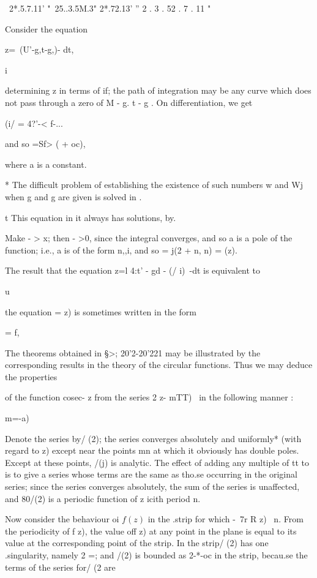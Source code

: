 { ~2*.5.7.11' "~25..3.5M.3" 2*.72.13' '' 2 . 3 . 52 . 7 . 11 "

 Consider the equation

z=\ (U'-g,t-g,)- dt,

  i

determining z in terms of if; the path of integration may be any
curve which does not pass through a zero of M - g. t - g . On
differentiation, we get

(i/ = 4?'-< f-...

and so =Sf> ( + oc),

where a is a constant.

* The difficult problem of establishing the existence of such numbers
w and Wj when g and g are given is solved in .

t This equation in it always has solutions, by.

%
%

Make - > x; then - >0, since the integral converges, and so a is a
pole of the function; i.e., a is of the form n,,i, and so = j(2 + n,
n) = (z).

The result that the equation z=l 4:t' - gd - (/ i)~-dt is equivalent
to

u

the equation = z) is sometimes written in the form

= f,


The theorems obtained in §>; 20'2-20'221 may be illustrated by the
corresponding results in the theory of the circular functions. Thus we
may deduce the properties

of the function cosec- z from the series 2 z- mTT)~ in the following
manner :

m=-a)

Denote the series by/ (2); the series converges absolutely and
uniformly* (with regard to z) except near the points mn at which it
obviously has double poles. Except at these points, /(j) is analytic.
The effect of adding any multiple of tt to is to give a series whose
terms are the same as tho.se occurring in the original series; since
the series converges absolutely, the sum of the series is unaffected,
and 80/(2) is a periodic function of z icith period n.

Now consider the behaviour oi $f(z)$ in the .strip for which -\ 7r R z)
\ n. From the periodicity of f z), the value off z) at any point in
the plane is equal to its value at the corresponding point of the
strip. In the strip/ (2) has one .singularity, namely 2 =; and /(2)
is bounded as 2-*-oc in the strip, becau.se the terms of the series
for/ (2 are

}

